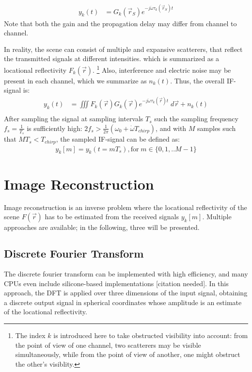 \begin{align}
    y_k(t) & = G_k(\vec r_S)e^{-j\dot\omega\tau_k(\vec r_S)t} \label{eqn:ideal_scatterer}
\end{align}
Note that both the gain and the propagation delay may differ from channel to channel.

In reality, the scene can consist of multiple and expansive scatterers,
that reflect the transmitted signals at different intensities.
which is summarized as a locational reflectivity $F_k(\vec r)$.
\footnote{
    The index $k$ is introduced here to take obstructed visibility into account:
    from the point of view of one channel, two scatterers may be visible simultaneously,
    while from the point of view of another, one might obstruct the other's visiblity.
}
Also, interference and electric noise may be present in each channel,
which we summarize as $n_k(t)$.
Thus, the overall IF-signal is:
\begin{align}
    y_k(t) & = \iiint F_k(\vec r)G_k(\vec r) e^{-j\dot\omega\tau_k(\vec r)t} \;d\vec r + n_k(t) \\
\end{align}
After sampling the signal at sampling intervals $T_s$ such the sampling frequency $f_s = \frac{1}{T_s}$
is sufficiently high: ${2f_s > \frac{1}{2\pi}(\omega_0 + \dot \omega T_{chirp})}$, and with $M$ samples such that $MT_s < T_{chirp}$,
the sampled IF-signal can be defined as:
\begin{align}
    y_k[m] = y_k(t=mT_s), \text{for}\;m \in \{0,1,..M-1\}
\end{align}

\section{Image Reconstruction}
Image reconstruction is an inverse problem where the locational reflectivity of the scene $F(\vec r)$
has to be estimated from the received signals $y_k[m]$.
Multiple approaches are available; in the following, three will be presented.

\subsection{Discrete Fourier Transform}
\label{ssec:dft_imaging_theory}
The discrete fourier transform can be implemented with high efficiency,
and many CPUs even include silicone-based implementations [citation needed].
In this approach, the DFT is applied over three dimensions of the input signal,
obtaining a discrete output signal in spherical coordinates whose amplitude is an estimate of the locational reflectivity.

